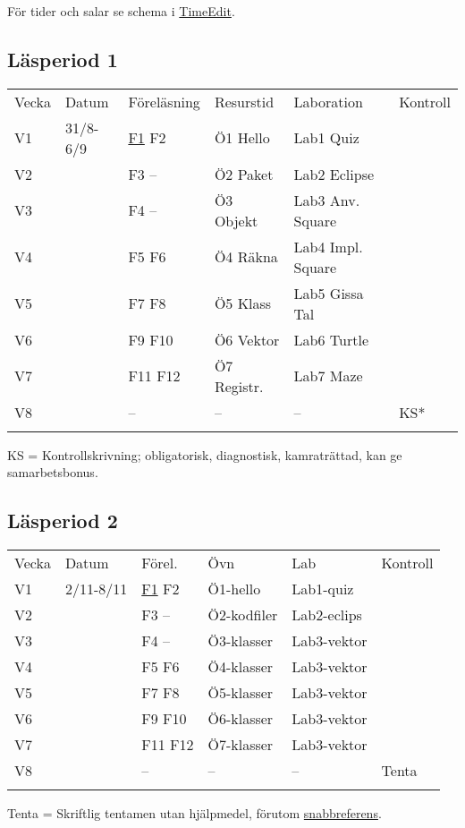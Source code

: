 För tider och salar se schema i
\href{http://cs.lth.se/eda016/schema}{TimeEdit}.

\subsection{Läsperiod 1}\label{lasperiod-1}

\begin{longtable}[c]{@{}llllll@{}}
\toprule\addlinespace
Vecka & Datum & Föreläsning & Resurstid & Laboration & Kontroll
\\\addlinespace
\midrule\endhead
V1 & 31/8-6/9 &
\href{http://fileadmin.cs.lth.se/cs/Education/EDA016/lectures/f1.pdf}{F1}
F2 & Ö1 Hello & Lab1 Quiz &
\\\addlinespace
V2 & & F3 -- & Ö2 Paket & Lab2 Eclipse &
\\\addlinespace
V3 & & F4 -- & Ö3 Objekt & Lab3 Anv. Square &
\\\addlinespace
V4 & & F5 F6 & Ö4 Räkna & Lab4 Impl. Square &
\\\addlinespace
V5 & & F7 F8 & Ö5 Klass & Lab5 Gissa Tal &
\\\addlinespace
V6 & & F9 F10 & Ö6 Vektor & Lab6 Turtle &
\\\addlinespace
V7 & & F11 F12 & Ö7 Registr. & Lab7 Maze &
\\\addlinespace
V8 & & -- & -- & -- & KS*
\\\addlinespace
\bottomrule
\end{longtable}

KS = Kontrollskrivning; obligatorisk, diagnostisk, kamraträttad, kan ge
samarbetsbonus.

\subsection{Läsperiod 2}\label{lasperiod-2}

\begin{longtable}[c]{@{}llllll@{}}
\toprule\addlinespace
Vecka & Datum & Förel. & Övn & Lab & Kontroll
\\\addlinespace
\midrule\endhead
V1 & 2/11-8/11 &
\href{http://fileadmin.cs.lth.se/cs/Education/EDA016/lectures/f1.pdf}{F1}
F2 & Ö1-hello & Lab1-quiz &
\\\addlinespace
V2 & & F3 -- & Ö2-kodfiler & Lab2-eclips &
\\\addlinespace
V3 & & F4 -- & Ö3-klasser & Lab3-vektor &
\\\addlinespace
V4 & & F5 F6 & Ö4-klasser & Lab3-vektor &
\\\addlinespace
V5 & & F7 F8 & Ö5-klasser & Lab3-vektor &
\\\addlinespace
V6 & & F9 F10 & Ö6-klasser & Lab3-vektor &
\\\addlinespace
V7 & & F11 F12 & Ö7-klasser & Lab3-vektor &
\\\addlinespace
V8 & & -- & -- & -- & Tenta
\\\addlinespace
\bottomrule
\end{longtable}

Tenta = Skriftlig tentamen utan hjälpmedel, förutom
\href{http://fileadmin.cs.lth.se/cs/Education/EDA016/general/quickref-booklet.pdf}{snabbreferens}.

